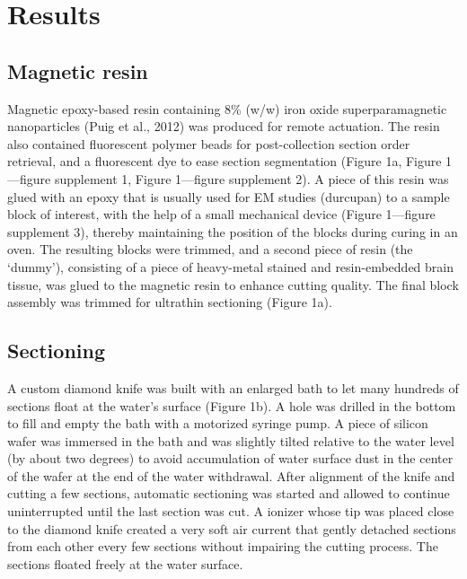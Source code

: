 \documentclass{article}
\begin{document}
\section*{Results}

\subsection*{Magnetic resin}

Magnetic epoxy-based resin containing 8\% (w/w) iron oxide superparamagnetic nanoparticles (Puig et al., 2012) was produced for remote actuation. The resin also contained fluorescent polymer beads for post-collection section order retrieval, and a fluorescent dye to ease section segmentation (Figure 1a, Figure 1---figure supplement 1, Figure 1---figure supplement 2). A piece of this resin was glued with an epoxy that is usually used for EM studies (durcupan) to a sample block of interest, with the help of a small mechanical device (Figure 1---figure supplement 3), thereby maintaining the position of the blocks during curing in an oven. The resulting blocks were trimmed, and a second piece of resin (the ‘dummy’), consisting of a piece of heavy-metal stained and resin-embedded brain tissue, was glued to the magnetic resin to enhance cutting quality. The final block assembly was trimmed for ultrathin sectioning (Figure 1a).

\subsection*{Sectioning}

A custom diamond knife was built with an enlarged bath to let many hundreds of sections float at the water’s surface (Figure 1b). A hole was drilled in the bottom to fill and empty the bath with a motorized syringe pump. A piece of silicon wafer was immersed in the bath and was slightly tilted relative to the water level (by about two degrees) to avoid accumulation of water surface dust in the center of the wafer at the end of the water withdrawal. After alignment of the knife and cutting a few sections, automatic sectioning was started and allowed to continue uninterrupted until the last section was cut. A ionizer whose tip was placed close to the diamond knife created a very soft air current that gently detached sections from each other every few sections without impairing the cutting process. The sections floated freely at the water surface.
\end{document}
